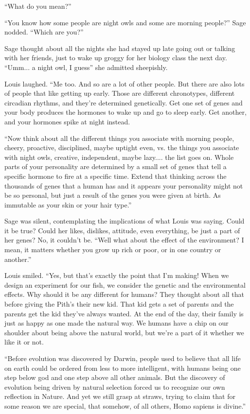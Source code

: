 \documentclass[12pt, fleqn, AofM.tex]{subfiles}
\begin{document}
“What do you mean?”

“You know how some people are night owls and some are morning people?” Sage nodded. “Which are you?”

Sage thought about all the nights she had stayed up late going out or talking with her friends, just to wake up groggy for her biology class the next day. “Umm... a night owl, I guess” she admitted sheepishly.

Louis laughed. “Me too. And so are a lot of other people. But there are also lots of people that like getting up early. Those are different chronotypes, different circadian rhythms, and they're determined genetically. Get one set of genes and your body produces the hormones to wake up and go to sleep early. Get another, and your hormones spike at night instead. 

“Now think about all the different things you associate with morning people, cheery,	proactive, disciplined, maybe uptight even, vs. the things you associate with night owls, creative, independent, maybe lazy.... the list goes on. Whole parts of your personality are determined by a small set of genes that tell a specific hormone to fire at a specific time. Extend that thinking across the thousands of genes that a human has and it appears your personality might not be so personal, but just a result of the genes you were given at birth. As immutable as your skin or your hair type.”

Sage was silent, contemplating the implications of what Louis was saying. Could it be true? Could her likes, dislikes, attitude, even everything, be just a part of her genes? No, it couldn't be. “Well what about the effect of the environment? I mean, it matters whether you grow up rich or poor, or in one country or another.”

Louis smiled. “Yes, but that's exactly the point that I'm making! When we design an experiment for our fish, we consider the genetic and the environmental effects. Why should it be any different for humans? They thought about all that before giving the Pith's their new kid. That kid gets a set of parents and the parents get the kid they've always wanted. At the end of the day, their family is just as happy as one made the natural way. We humans have a chip on our shoulder about being above the natural world, but we're a part of it whether we like it or not.

“Before evolution was discovered by Darwin, people used to believe that all life on earth could be ordered from less to more intelligent, with humans being one step below god and one step above all other animals. But the discovery of evolution being driven by natural selection forced us to recognize our own reflection in Nature. And yet we still grasp at straws, trying to claim that for some reason we are special, that somehow, of all others, Homo sapiens is divine.”
\end{document}

